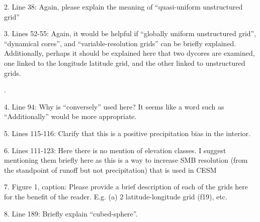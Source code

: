 \documentclass[12pt,oneside,a4paper]{article}%
\begin{document}
2. Line 38: Again, please explain the meaning of “quasi-uniform unstructured grid”  \newline

{\color{blue}{See above.}} \newline

3. Lines 52-55: Again, it would be helpful if “globally uniform unstructured grid”, “dynamical cores”, and “variable-resolution grids” can be briefly explained. Additionally, perhaps it should be explained here that two dycores are examined, one linked to the longitude latitude grid, and the other linked to unstructured grids.  \newline

{\color{blue}{Added clarification for the meaning of quasi-uniform and variable-resolution. Decided against getting into the specifics of which dycore uses which grid, as this becomes apparent later on in the introduction}}. \newline

4. Line 94: Why is “conversely” used here? It seems like a word such as “Additionally” would be more appropriate.  \newline

{\color{blue}{Sentence has been reworded.}} \newline

5. Lines 115-116: Clarify that this is a positive precipitation bias in the interior.  \newline

{\color{blue}{Done.}} \newline

6. Lines 111-123: Here there is no mention of elevation classes. I suggest mentioning them briefly here as this is a way to increase SMB resolution (from the standpoint of runoff but not precipitation) that is used in CESM  \newline

{\color{blue}{We agree that the idea of ECs should be introduced here, and have added a sentence.}} \newline

7. Figure 1, caption: Please provide a brief description of each of the grids here for the benefit of the reader. E.g. (a) 2 latitude-longitude grid (f19), etc.  \newline

{\color{blue}{Done.}} \newline

8. Line 189: Briefly explain “cubed-sphere”.  \newline
\end{document}
